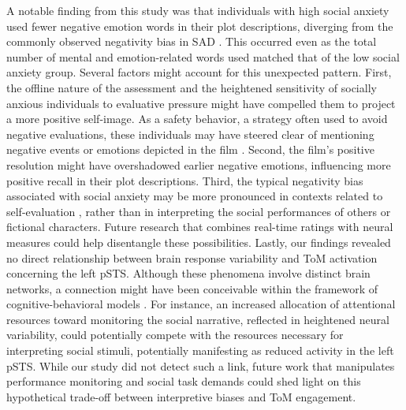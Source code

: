 A notable finding from this study was that individuals with high social anxiety used fewer negative emotion words in their plot descriptions, diverging from the commonly observed negativity bias in SAD \citep{hirsch2004}. This occurred even as the total number of mental and emotion-related words used matched that of the low social anxiety group. Several factors might account for this unexpected pattern. First, the offline nature of the assessment and the heightened sensitivity of socially anxious individuals to evaluative pressure might have compelled them to project a more positive self-image. As a safety behavior, a strategy often used to avoid negative evaluations, these individuals may have steered clear of mentioning negative events or emotions depicted in the film \citep{prieto-fidalgo2024,wechsler1997}. Second, the film's positive resolution might have overshadowed earlier negative emotions, influencing more positive recall in their plot descriptions. Third, the typical negativity bias associated with social anxiety may be more pronounced in contexts related to self-evaluation \citep{koban2023,ballespi2019,hirsch2004,yoon2019}, rather than in interpreting the social performances of others or fictional characters. Future research that combines real-time ratings with neural measures could help disentangle these possibilities.
Lastly, our findings revealed no direct relationship between brain response variability and ToM activation concerning the left pSTS. Although these phenomena involve distinct brain networks, a connection might have been conceivable within the framework of cognitive-behavioral models \citep{clark1995,rapee1997}. For instance, an increased allocation of attentional resources toward monitoring the social narrative, reflected in heightened neural variability, could potentially compete with the resources necessary for interpreting social stimuli, potentially manifesting as reduced activity in the left pSTS. While our study did not detect such a link, future work that manipulates performance monitoring and social task demands could shed light on this hypothetical trade-off between interpretive biases and ToM engagement.
